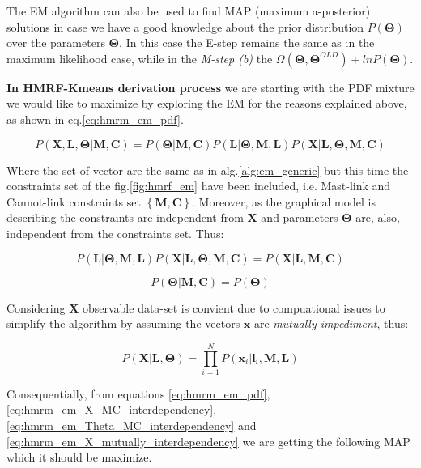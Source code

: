\documentclass[dvips,dvipdfm,pdftex]{llncs}
\begin{document}
The EM algorithm can also be used to find MAP (maximum a-posterior) solutions in case we have a good knowledge about the prior distribution $P(\mathbf{\Theta})$ over the parameters $\mathbf{\Theta}$. In this case the E-step remains the same as in the maximum likelihood case, while in the \emph{M-step (b)} the $\Omega(\mathbf{\Theta},\mathbf{\Theta}^{OLD})+lnP(\mathbf{\Theta})$.

\textbf{In HMRF-Kmeans derivation process} we are starting with the PDF mixture we would like to maximize by exploring the EM for the reasons explained above, as shown in eq.\ref{eq:hmrm_em_pdf}.

\begin{equation}
	P(\mathbf{X,L,\Theta}|\mathbf{M,C})=P(\mathbf{\Theta}|\mathbf{M,C})P(\mathbf{L}|\mathbf{\Theta,M,L})P(\mathbf{X}|\mathbf{L,\Theta,M,C})
\label{eq:hmrm_em_pdf}
\end{equation}

Where the set of vector are the same as in alg.\ref{alg:em_generic} but this time the constraints set of the fig.\ref{fig:hmrf_em} have been included, i.e. Mast-link and Cannot-link constraints set $\left\{\mathbf{M,C}\right\}$. Moreover, as the graphical model is describing the constraints are independent from $\mathbf{X}$ and parameters $\mathbf{\Theta}$ are, also, independent from the constraints set. Thus:

\begin{equation}
	P(\mathbf{L}|\mathbf{\Theta,M,L})P(\mathbf{X}|\mathbf{L,\Theta,M,C})=P(\mathbf{X}|\mathbf{L,M,C})
\label{eq:hmrm_em_X_MC_interdependency}
\end{equation}

\begin{equation}
	P(\mathbf{\Theta}|\mathbf{M,C})=P(\mathbf{\Theta})
\label{eq:hmrm_em_Theta_MC_interdependency}
\end{equation}

Considering $\mathbf{X}$ observable data-set is convient due to compuational issues to simplify the algorithm by assuming the vectors $\mathbf{x}$ are \emph{mutually impediment}, thus:

\begin{equation}
	P(\mathbf{X}|\mathbf{L,\Theta})=\prod_{i=1}^{N}P(\mathbf{x}_{i}|\mathbf{l}_{i},\mathbf{M,L})
\label{eq:hmrm_em_X_mutually_interdependency}
\end{equation}

Consequentially, from equations \ref{eq:hmrm_em_pdf}, \ref{eq:hmrm_em_X_MC_interdependency}, \ref{eq:hmrm_em_Theta_MC_interdependency} and \ref{eq:hmrm_em_X_mutually_interdependency} we are getting the following MAP which it should be maximize.
\end{document}
